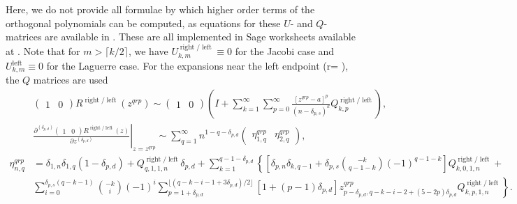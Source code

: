 \documentclass[11pt]{article}
\newcommand{\R}{{\operatorname{right}}}
\renewcommand{\L}{{\operatorname{left}}}
\newcommand{\qg}{q}
\newcommand{\rg}{r}
\newcommand{\rr}{{\scriptsize \Romanbar{3}} }
\newcommand{\rl}{{\scriptsize \Romanbar{4}} }
\newcommand{\pg}{p}
\newcommand{\pn}{n}
\newcommand{\pd}{d}
\newcommand{\ps}{s}
\numberwithin{equation}{section}
\begin{document}
Here, we do not provide all formulae by which higher order terms of the orthogonal polynomials can be computed, as equations for these $U$- and $Q$-matrices are available in \cite{jacobi,laguerre}. These are all implemented in Sage worksheets available at \cite{ninesJac,ninesLag}. %
Note that for $m > \lceil k/2 \rceil$, we have $U_{k,m}^{\R/\L} \equiv 0$ for the Jacobi case and $U_{k,m}^{\L} \equiv 0$ for the Laguerre case. For the expansions near the left endpoint (\rg = \rl), the $Q$ matrices are used %
\begin{align}
	& \begin{pmatrix} 1 & 0 \end{pmatrix} R^{\R/\L}(z^{\qg\rg\pg}) \sim \begin{pmatrix} 1 & 0 \end{pmatrix}  \left( I+ \sum_{k=1}^\infty \sum_{p=0}^\infty \frac{\left[ z^{\qg\rg\pg} -a \right]^p}{\left(n -\delta_{\pg,\ps} \right)^k} Q_{k,p}^{\R/\L} \right), \\   %
	& \left.\frac{\partial^{(\delta_{\pg,\pd})} \begin{pmatrix} 1 & 0 \end{pmatrix} R^{\R/\L}(z) }{\partial z^{(\delta_{\pg,\pd})} } \right|_{z = z^{\qg\rg\pg}}  \sim \sum_{q=1}^\infty n^{1-q -\delta_{\pg,\pd} } \begin{pmatrix} \eta_{1,q}^{\qg\rg\pg} & \eta_{2,q}^{\qg\rg\pg} \end{pmatrix},  \\
	\eta_{n,q}^{\qg\rg\pg} & = \delta_{1,n}\delta_{1,q} \left(1-\delta_{\pg,\pd}\right) + Q_{q,1,1,n}^{\R/\L} \delta_{\pg,\pd} +  \sum_{k=1}^{q-1 -\delta_{\pg,\pd} } \left\{ \left[\delta_{\pg,\pn} \delta_{k,q-1} + \delta_{\pg,\ps} {-k \choose q-1-k} (-1)^{q-1-k} \right] Q_{k,0, 1,n}^{\R/\L} + \right. \\ %
	& \left. \sum_{i=0}^{\delta_{\pg,\ps}(q-k-1)} {-k \choose i} (-1)^i \sum_{p=1+\delta_{\pg,\pd} }^{\lfloor (q-k-i-1+3\delta_{\pg,\pd})/2 \rfloor} \left[1 + (p-1)\delta_{\pg,\pd} \right] z_{p-\delta_{\pg,\pd},q-k-i-2+ (5-2p)\delta_{\pg,\pd}}^{\qg\rg\pg} Q_{k,p,1,n}^{\R/\L} \right\}. %
\end{align}
\end{document}
